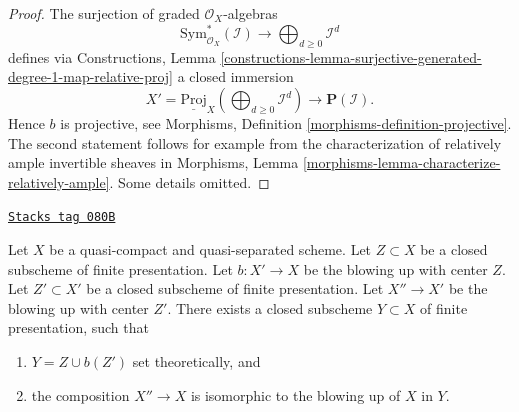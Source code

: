 \begin{proof}
The surjection of graded $\mathcal{O}_X$-algebras
$$
\text{Sym}_{\mathcal{O}_X}^*(\mathcal{I})
\longrightarrow
\bigoplus\nolimits_{d \geq 0} \mathcal{I}^d
$$
defines via Constructions, Lemma
\ref{constructions-lemma-surjective-generated-degree-1-map-relative-proj}
a closed immersion
$$
X' = \underline{\text{Proj}}_X (\bigoplus\nolimits_{d \geq 0} \mathcal{I}^d)
\longrightarrow
\mathbf{P}(\mathcal{I}).
$$
Hence $b$ is projective, see
Morphisms, Definition \ref{morphisms-definition-projective}.
The second statement follows for example from the characterization
of relatively ample invertible sheaves in
Morphisms, Lemma \ref{morphisms-lemma-characterize-relatively-ample}.
Some details omitted.
\end{proof}

\begin{lemma}
\label{divisors-lemma-composition-finite-type-blowups}
\href{https://stacks.math.columbia.edu/tag/080B}{\texttt{Stacks tag 080B}}


Let $X$ be a quasi-compact and quasi-separated scheme.
Let $Z \subset X$ be a closed subscheme of finite presentation.
Let $b : X' \to X$ be the blowing up with center $Z$. Let $Z' \subset X'$ be
a closed subscheme of finite presentation.
Let $X'' \to X'$ be the blowing up with center $Z'$.
There exists a closed subscheme $Y \subset X$ of finite presentation,
such that
\begin{enumerate}
\item $Y = Z \cup b(Z')$ set theoretically, and
\item the composition $X'' \to X$ is isomorphic to the blowing up
of $X$ in $Y$.
\end{enumerate}
\end{lemma}

